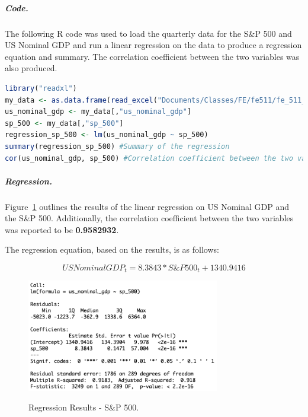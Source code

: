 \documentclass[11pt]{article}
\numberwithin{equation}{section}
\begin{document}
\subparagraph{Code.}
The following R code was used to load the quarterly data for the S\&P 500 and US Nominal GDP and run a linear regression on the data to produce a regression equation and summary. The correlation coefficient between the two variables was also produced.

\vspace{3mm}
\begin{lstlisting}[language=R]
library("readxl")
my_data <- as.data.frame(read_excel("Documents/Classes/FE/fe511/fe_511_final_project/fe_511_data.xlsx"))
us_nominal_gdp <- my_data[,"us_nominal_gdp"]
sp_500 <- my_data[,"sp_500"]
regression_sp_500 <- lm(us_nominal_gdp ~ sp_500)
summary(regression_sp_500) #Summary of the regression
cor(us_nominal_gdp, sp_500) #Correlation coefficient between the two variables

\end{lstlisting}
\vspace{3mm}

\subparagraph{Regression.}
Figure~\ref{fig:model1} outlines the results of the linear regression on US Nominal GDP and the S\&P 500. Additionally, the correlation coefficient between the two variables was reported to be \textbf{0.9582932}.

The regression equation, based on the results, is as follows:

\[ US Nominal GDP_{t} = 8.3843*S\&P500_{t} + 1340.9416 \]

\begin{figure}
	\begin{center}
		{\includegraphics[width=0.75\textwidth]{regression_results_sp500.png}}
	\end{center}
	\caption{Regression Results - S\&P 500.}
	\label{fig:model1}
\end{figure}
\end{document}
